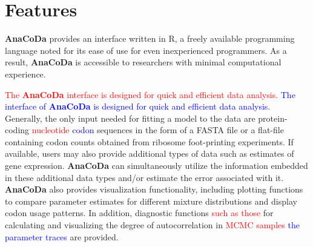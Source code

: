 \documentclass{bioinfo}
\newcommand{\package}{\textbf{AnaCoDa}\xspace} %
\begin{document}
\section*{Features}
\package provides an interface written in R, a freely available programming language noted for its ease of use for even inexperienced programmers. 
As a result, \package is accessible to researchers with minimal computational experience. 

\textcolor{red}{The \package interface is designed for quick and efficient data analysis.}
\textcolor{blue}{The interface of \package is designed for quick and efficient data analysis.}
Generally, the only input needed for fitting a model to the data are protein-coding \textcolor{red}{nucleotide} \textcolor{blue}{codon} sequences in the form of a FASTA file or a flat-file containing codon counts obtained from ribosome foot-printing experiments. 
If available, users may also provide additional types of data such as estimates of gene expression.
\package can simultaneously utilize the information embedded in these additional data types and/or estimate the error associated with it.
\package also provides visualization functionality, including plotting functions to compare parameter estimates for different mixture distributions and display codon usage patterns. 
In addition, diagnostic functions \textcolor{red}{such as those} for calculating and visualizing the degree of autocorrelation in \textcolor{red}{MCMC samples} \textcolor{blue}{the parameter traces} are provided.

\end{document}
